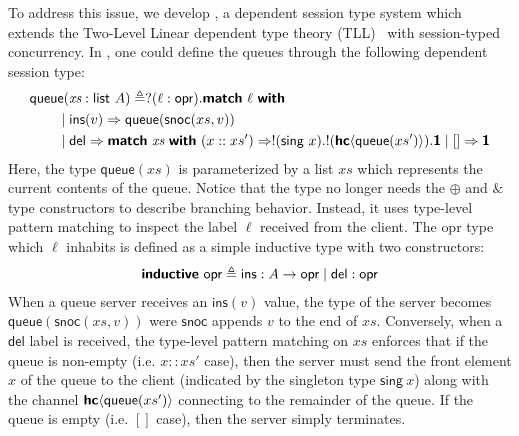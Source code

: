 To address this issue, we develop \TLLC{}, a dependent session type system which
extends the Two-Level Linear dependent type theory (TLL)~\cite{fu23} with
session-typed concurrency. In \TLLC{}, one could define the queues through the following
dependent session type:
\begin{alignat*}{2}
  &\textsf{queue} (\textit{xs} : \textsf{list}\ A) \triangleq ?(\ell : \textsf{opr}). \textbf{\textsf{match}}\ \ell\ \textbf{\textsf{with}} \\
  &\qquad\mid \textsf{ins}(v) \Rightarrow \textsf{queue}(\textsf{snoc}(xs, v)) \\
  &\qquad\mid \textsf{del} \Rightarrow
    \textbf{\textsf{match}}\ \textit{xs}\ \textbf{\textsf{with}}
    \ (x :: xs') \Rightarrow !(\textsf{sing}\ x). !({\textbf{\textsf{hc}}\langle{\textsf{queue}(xs')}\rangle}). \textbf{\textsf{1}}
    \mid [] \Rightarrow \textbf{\textsf{1}}
\end{alignat*}
Here, the type $\textsf{queue}(\textit{xs})$ is parameterized by a list $\textit{xs}$
which represents the current contents of the queue. Notice that the type no longer needs
the $\oplus$ and $\&$ type constructors to describe branching behavior. Instead, it uses
type-level pattern matching to inspect the label $\ell$ received from the client.
The \textsf{opr} type which $\ell$ inhabits is defined as a simple inductive type with
two constructors:
\begin{align*}
  \textbf{\textsf{inductive}}\ \textsf{opr} \triangleq \textsf{ins}: A \rightarrow \textsf{opr} \mid \textsf{del}: \textsf{opr}
\end{align*}
When a queue server receives an $\textsf{ins}(v)$ value, the type of the server becomes
$\textsf{queue}(\textsf{snoc}(xs, v))$ were $\textsf{snoc}$ appends $v$ to the end of $xs$.
Conversely, when a $\textsf{del}$ label is received, the type-level pattern matching on $xs$
enforces that if the queue is non-empty (i.e. $x :: xs'$ case), then the server must send
the front element $x$ of the queue to the client (indicated by the singleton type
$\textsf{sing}\ x$) along with the channel ${\textbf{\textsf{hc}}\langle{\textsf{queue}(xs')}\rangle}$ connecting to the remainder
of the queue. If the queue is empty (i.e. $[]$ case), then the server simply terminates.

